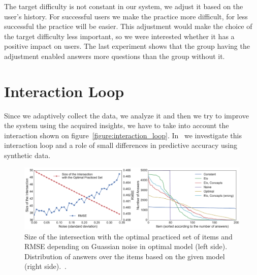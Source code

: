 \documentclass[table,color]{fithesis3/fithesis3}
\begin{document}
The target difficulty is not constant in our system, we adjust it based on the
user's history. For successful users we make the practice more difficult, for
less successful the practice will be easier. This adjustment would make the
choice of the target difficulty less important, so we were interested whether
it has a positive impact on users. The last experiment shows that the group
having the adjustment enabled answers more questions than the group without it.

\section{Interaction Loop}

Since we adaptively collect the data, we analyze it and then we try to improve
the system using the acquired insights, we have to take into account the
interaction shown on figure~\ref{figure:interaction_loop}.
In~\cite{niznan2015exploring} we investigate this interaction loop and a role of
small differences in predictive accuracy using synthetic data.

\begin{figure}[h]
	\begin{center}
		\includegraphics[width=\textwidth]{figure/noise_vs_intersection_number_of_answers}
		\caption{Size of the intersection with the optimal practiced set of items and RMSE
			depending on Guassian noise in optimal model (left side). Distribution of answers over
			the items based on the given model (right side).~\cite{niznan2015exploring}.}
		\label{figure:feedback_by_success}
	\end{center}
\end{figure}



\end{document}
